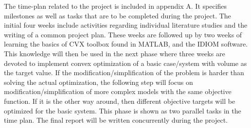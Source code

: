 The time-plan related to the project is included in appendix A. It specifies milestones as well as tasks that are to be completed during the project. The initial four weeks include activities regarding individual literature studies and the writing of a common project plan. These weeks are followed up by two weeks of learning the basics of CVX toolbox found in MATLAB, and the IDIOM software. This knowledge will then be used in the next phase where three weeks are devoted to implement convex optimization of a basic case/system with volume as the target value. If the modification/simplification of the problem is harder than solving the actual optimization, the following step will focus on modification/simplification of more complex models with the same objective function. If it is the other way around, then different objective targets will be optimized for the basic system. This phase is shown as two parallel tasks in the time plan. The final report will be written concurrently during the project.